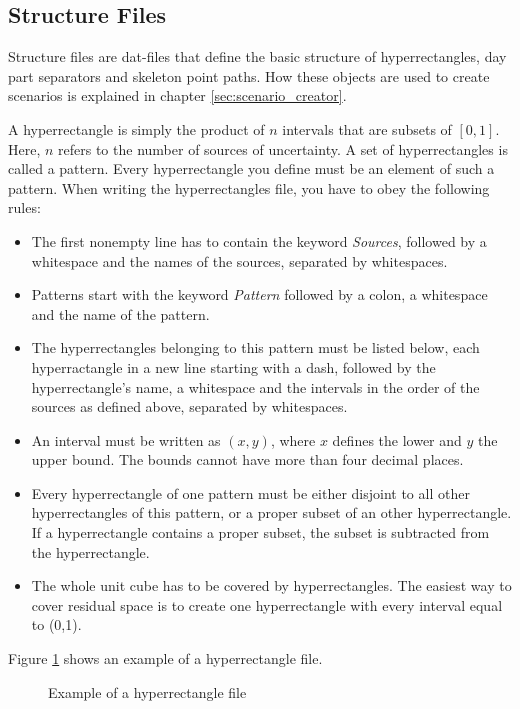 \documentclass[11pt]{article}
\begin{document}
\subsection{Structure Files}

Structure files are dat-files that define the basic structure of hyperrectangles, day part separators and skeleton point paths. How these objects are used to create scenarios is explained in chapter \ref{sec:scenario_creator}.

A hyperrectangle is simply the product of $n$ intervals that are subsets of $[0,1]$. Here, $n$ refers to the number of sources of uncertainty. A set of hyperrectangles is called a pattern. Every hyperrectangle you define must be an element of such a pattern. When writing the hyperrectangles file, you have to obey the following rules:
\begin{itemize}
	\item The first nonempty line has to contain the keyword \textit{Sources}, followed by a whitespace and the names of the sources, separated by whitespaces.
	\item Patterns start with the keyword \textit{Pattern} followed by a colon, a whitespace and the name of the pattern.
	\item The hyperrectangles belonging to this pattern must be listed below, each hyperractangle in a new line starting with a dash, followed by the hyperrectangle's name, a whitespace and the intervals in the order of the sources as defined above, separated by whitespaces.
	\item An interval must be written as $(x,y)$, where $x$ defines the lower and $y$ the upper bound. The bounds cannot have more than four decimal places.
	\item Every hyperrectangle of one pattern must be either disjoint to all other hyperrectangles of this pattern, or a proper subset of an other hyperrectangle. If a hyperrectangle contains a proper subset, the subset is subtracted from the hyperrectangle.
	\item The whole unit cube has to be covered by hyperrectangles. The easiest way to cover residual space is to create one hyperrectangle with every interval equal to (0,1).
\end{itemize}
Figure \ref{fig:hyperrectangle-file} shows an example of a hyperrectangle file.

\begin{figure}[H]
	\begin{framed}
		
	\end{framed}
	\caption{Example of a hyperrectangle file}
	\label{fig:hyperrectangle-file}
\end{figure}
\end{document}
